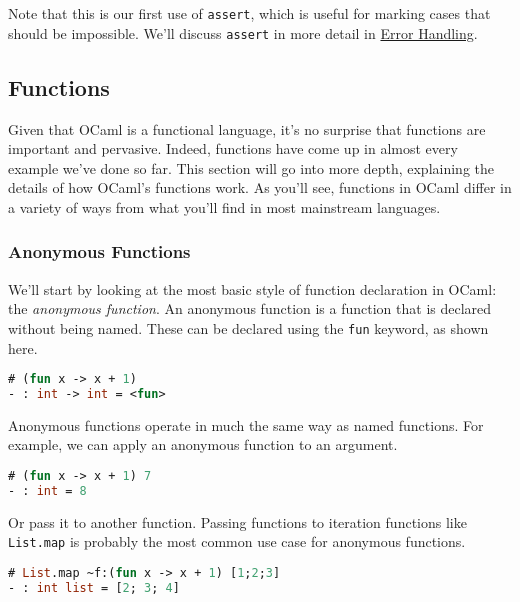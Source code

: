 Note that this is our first use of \passthrough{\lstinline!assert!},
which is useful for marking cases that should be impossible. We'll
discuss \passthrough{\lstinline!assert!} in more detail in
\href{error-handling.html\#error-handling}{Error Handling}.

\hypertarget{functions}{%
\subsection{Functions}\label{functions}}

Given that OCaml is a functional language, it's no surprise that
functions are important and pervasive. Indeed, functions have come up in
almost every example we've done so far. This section will go into more
depth, explaining the details of how OCaml's functions work. As you'll
see, functions in OCaml differ in a variety of ways from what you'll
find in most mainstream languages.

\hypertarget{anonymous-functions}{%
\subsubsection{Anonymous Functions}\label{anonymous-functions}}

We'll start by looking at the most basic style of function declaration
in OCaml: the \emph{anonymous function}. An anonymous function is a
function that is declared without being named. These can be declared
using the \passthrough{\lstinline!fun!} keyword, as shown here.

\begin{lstlisting}[language=Caml]
# (fun x -> x + 1)
- : int -> int = <fun>
\end{lstlisting}

Anonymous functions operate in much the same way as named functions. For
example, we can apply an anonymous function to an argument.

\begin{lstlisting}[language=Caml]
# (fun x -> x + 1) 7
- : int = 8
\end{lstlisting}

Or pass it to another function. Passing functions to iteration functions
like \passthrough{\lstinline!List.map!} is probably the most common use
case for anonymous functions.

\begin{lstlisting}[language=Caml]
# List.map ~f:(fun x -> x + 1) [1;2;3]
- : int list = [2; 3; 4]
\end{lstlisting}

